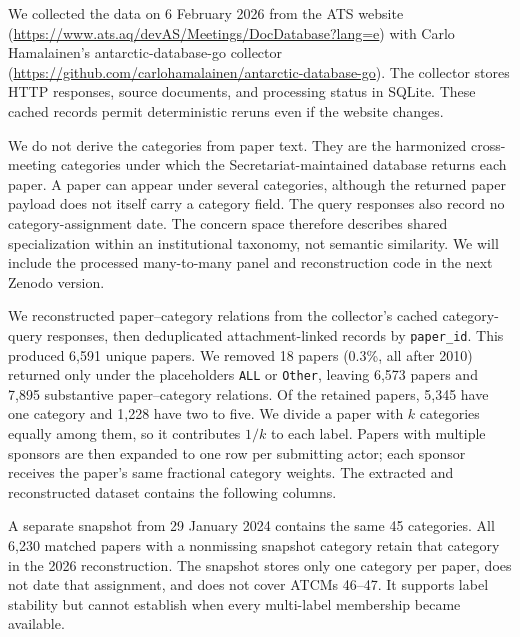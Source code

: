 \documentclass{fun_article}
\begin{document}
We collected the data on 6 February 2026 from the ATS website (\url{https://www.ats.aq/devAS/Meetings/DocDatabase?lang=e}) with Carlo Hamalainen's antarctic-database-go collector (\url{https://github.com/carlohamalainen/antarctic-database-go}). The collector stores HTTP responses, source documents, and processing status in SQLite. These cached records permit deterministic reruns even if the website changes.

We do not derive the categories from paper text. They are the harmonized cross-meeting categories under which the Secretariat-maintained database returns each paper. A paper can appear under several categories, although the returned paper payload does not itself carry a category field. The query responses also record no category-assignment date. The concern space therefore describes shared specialization within an institutional taxonomy, not semantic similarity. We will include the processed many-to-many panel and reconstruction code in the next Zenodo version.

We reconstructed paper--category relations from the collector's cached category-query responses, then deduplicated attachment-linked records by \texttt{paper\_id}. This produced 6,591 unique papers. We removed 18 papers (0.3\%, all after 2010) returned only under the placeholders \texttt{ALL} or \texttt{Other}, leaving 6,573 papers and 7,895 substantive paper--category relations. Of the retained papers, 5,345 have one category and 1,228 have two to five. We divide a paper with $k$ categories equally among them, so it contributes $1/k$ to each label. Papers with multiple sponsors are then expanded to one row per submitting actor; each sponsor receives the paper's same fractional category weights. The extracted and reconstructed dataset contains the following columns.

A separate snapshot from 29 January 2024 contains the same 45 categories. All 6,230 matched papers with a nonmissing snapshot category retain that category in the 2026 reconstruction. The snapshot stores only one category per paper, does not date that assignment, and does not cover ATCMs 46--47. It supports label stability but cannot establish when every multi-label membership became available.
\end{document}
